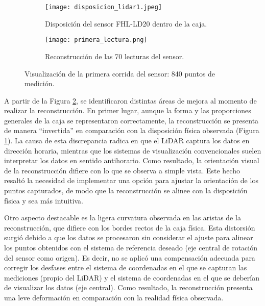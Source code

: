 \begin{figure}[H]
	\centering
	\begin{subfigure}{0.8\textwidth}
		\centering
		\texttt{[image: disposicion\_lidar1.jpeg]}
		\caption{Disposición del sensor FHL-LD20 dentro de la caja.}
		\label{primera_corrida_disp}
		\vspace{1em}
	\end{subfigure}
	\begin{subfigure}{0.8\textwidth}
		\centering
		\texttt{[image: primera\_lectura.png]}
		\caption{Reconstrucción de las 70 lecturas del sensor.}
		\label{primera_corrida_recon}
	\end{subfigure}
	\caption{Visualización de la primera corrida del sensor: 840 puntos de medición.}
	\label{primera_corrida}
\end{figure}
A partir de la Figura \ref{primera_corrida_recon}, se identificaron distintas áreas de mejora al momento de realizar la reconstrucción. En primer lugar, aunque la forma y las proporciones generales de la caja se representaron correctamente, la reconstrucción se presenta de manera ``invertida'' en comparación con la disposición física observada (Figura \ref{primera_corrida_disp}). La causa de esta discrepancia radica en que el LiDAR captura los datos en dirección horaria, mientras que los sistemas de visualización convencionales suelen interpretar los datos en sentido antihorario. Como resultado, la orientación visual de la reconstrucción difiere con lo que se observa a simple vista. Este hecho resaltó la necesidad de implementar una opción para ajustar la orientación de los puntos capturados, de modo que la reconstrucción se alinee con la disposición física y sea más intuitiva.

Otro aspecto destacable es la ligera curvatura observada en las aristas de la reconstrucción, que difiere con los bordes rectos de la caja física. Esta distorsión surgió debido a que los datos se procesaron sin considerar el ajuste para alinear los puntos obtenidos con el sistema de referencia deseado (eje central de rotación del sensor como origen). Es decir, no se aplicó una compensación adecuada para corregir los desfases entre el sistema de coordenadas en el que se capturan las mediciones (propio del LiDAR) y el sistema de coordenadas en el que se deberían de visualizar los datos (eje central). Como resultado, la reconstrucción presenta una leve deformación en comparación con la realidad física observada.

